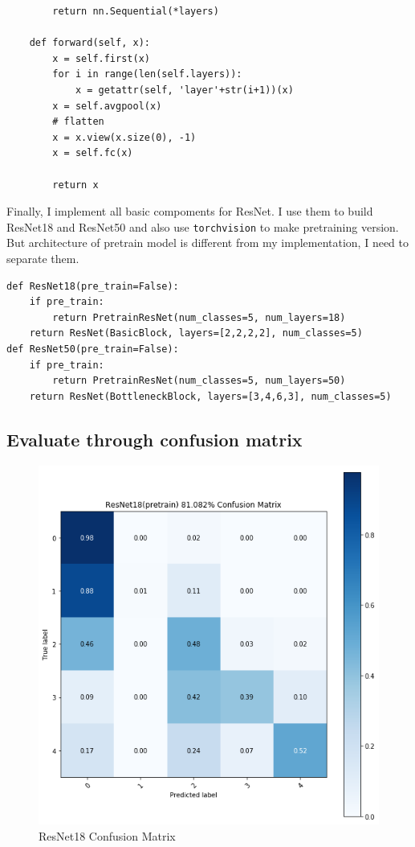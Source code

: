 \documentclass[12pt]{article}
\begin{document}
\begin{verbatim}
        return nn.Sequential(*layers)
    
    def forward(self, x):
        x = self.first(x)
        for i in range(len(self.layers)):
            x = getattr(self, 'layer'+str(i+1))(x)
        x = self.avgpool(x)
        # flatten
        x = x.view(x.size(0), -1)
        x = self.fc(x)
        
        return x
\end{verbatim}

Finally, I implement all basic compoments for ResNet. I use them to build ResNet18 and ResNet50 and also use \verb|torchvision| to make pretraining version. But architecture of pretrain model is different from my implementation, I need to separate them.

\begin{verbatim}
def ResNet18(pre_train=False):
    if pre_train:
        return PretrainResNet(num_classes=5, num_layers=18)
    return ResNet(BasicBlock, layers=[2,2,2,2], num_classes=5)
def ResNet50(pre_train=False):
    if pre_train:
        return PretrainResNet(num_classes=5, num_layers=50)
    return ResNet(BottleneckBlock, layers=[3,4,6,3], num_classes=5)
\end{verbatim}

\subsection{Evaluate through confusion matrix}

\begin{figure}[H]
\centering
\includegraphics[width=\linewidth]{Images/ResNet18CM.png}
\caption{ResNet18 Confusion Matrix}
\end{figure}
\end{document}
